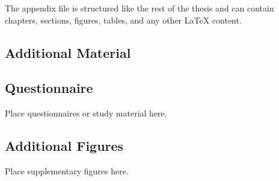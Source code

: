 \begin{listing}[H]
\begin{code}
\printbibliography
\appendix

\end{code}
\caption{Including an appendix}
\end{listing}

The appendix file is structured like the rest of the thesis and can contain chapters, sections, figures, tables, and any other \LaTeX{} content.

\begin{listing}[H]
\begin{code}
\chapter{Additional Material}
\section{Questionnaire}
Place questionnaires or study material here.
\section{Additional Figures}
Place supplementary figures here.
\end{code}
\caption{Example appendix file}
\end{listing}